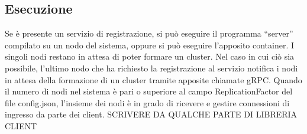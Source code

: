 \documentclass[conference]{IEEEtran}
\begin{document}
\subsection{Esecuzione}
Se è presente un servizio di registrazione, si può eseguire il programma ``server'' compilato su un nodo del sistema, oppure
si può eseguire l'apposito container. I singoli nodi restano in attesa di poter formare un cluster. Nel caso in cui ciò
sia possibile, l'ultimo nodo che ha richiesto la registrazione al servizio notifica i nodi in attesa della formazione di
un cluster tramite apposite chiamate gRPC. Quando il numero di nodi nel sistema è pari o superiore al campo ReplicationFactor
del file config.json, l'insieme dei nodi è in grado di ricevere e gestire connessioni di ingresso da parte dei client.
SCRIVERE DA QUALCHE PARTE DI LIBRERIA CLIENT


\printbibliography
\end{document}
